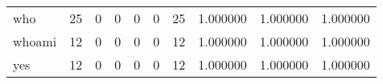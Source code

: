 \begin{longtable}{lrrrrrrrrr}
who       &                                      25 &                                                  0 &                                                  0 &                                                  0 &                                                  0 &                                                 25 &                                           1.000000 &                               1.000000 &                             1.000000 \\
whoami    &                                      12 &                                                  0 &                                                  0 &                                                  0 &                                                  0 &                                                 12 &                                           1.000000 &                               1.000000 &                             1.000000 \\
yes       &                                      12 &                                                  0 &                                                  0 &                                                  0 &                                                  0 &                                                 12 &                                           1.000000 &                               1.000000 &                             1.000000 \\
\end{longtable}
